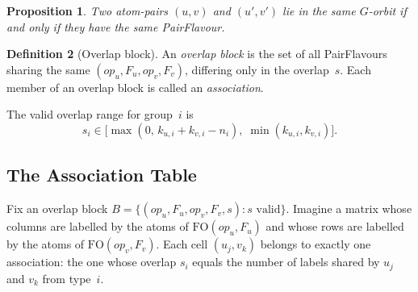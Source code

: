 \documentclass[11pt,a4paper]{article}
\theoremstyle{definition}
\newtheorem{definition}{Definition}[section]
\theoremstyle{plain}
\newtheorem{proposition}[definition]{Proposition}
\theoremstyle{remark}
\newcommand{\fo}{\mathrm{FO}}
\begin{document}
\begin{proposition}
Two atom-pairs $(u,v)$ and $(u',v')$ lie in the same $G$-orbit if and only if
they have the same PairFlavour.
\end{proposition}

\begin{definition}[Overlap block]
An \emph{overlap block} is the set of all PairFlavours sharing the same
$(\mathit{op}_u, F_u, \mathit{op}_v, F_v)$, differing only in the overlap~$s$.
Each member of an overlap block is called an \emph{association}.

The valid overlap range for group~$i$ is
\[
  s_i \in \bigl[\max(0,\, k_{u,i}+k_{v,i}-n_i),\; \min(k_{u,i}, k_{v,i})\bigr].
\]
\end{definition}

\subsection{The Association Table}

Fix an overlap block $B = \{(\mathit{op}_u, F_u, \mathit{op}_v, F_v, s) : s
\text{ valid}\}$.  Imagine a matrix whose columns are labelled by the atoms of
$\fo(\mathit{op}_u, F_u)$ and whose rows are labelled by the atoms of
$\fo(\mathit{op}_v, F_v)$.  Each cell $(u_j, v_k)$ belongs to exactly one
association: the one whose overlap $s_i$ equals the number of labels shared by
$u_j$ and $v_k$ from type~$i$.
\end{document}
